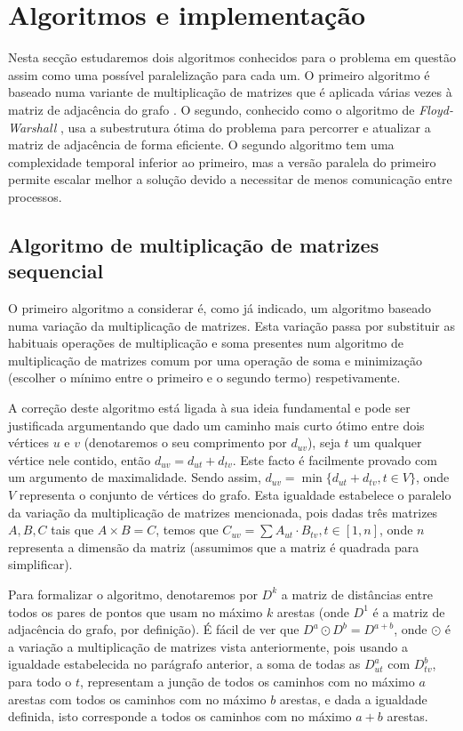\documentclass[10pt,a4paper,oneside]{article}
\begin{document}
\section{Algoritmos e implementação}
\label{sec:ai}
Nesta secção estudaremos dois algoritmos conhecidos para o problema em
questão assim como uma possível paralelização para cada um. O primeiro
algoritmo é baseado numa variante de multiplicação de matrizes que é
aplicada várias vezes à matriz de adjacência do grafo
\cite{shimbel1953structural}. O segundo, conhecido como o algoritmo de
\textit{Floyd-Warshall} \cite{floyd1962algorithm}, usa a subestrutura
ótima do problema para percorrer e atualizar a matriz de adjacência de
forma eficiente. O segundo algoritmo tem uma complexidade temporal
inferior ao primeiro, mas a versão paralela do primeiro permite
escalar melhor a solução devido a necessitar de menos comunicação
entre processos.

\subsection{Algoritmo de multiplicação de matrizes sequencial}
O primeiro algoritmo a considerar é, como já indicado, um algoritmo
baseado numa variação da multiplicação de matrizes. Esta variação
passa por substituir as habituais operações de multiplicação e soma
presentes num algoritmo de multiplicação de matrizes comum por uma
operação de soma e minimização (escolher o mínimo entre o primeiro e o
segundo termo) respetivamente.

A correção deste algoritmo está ligada à sua ideia fundamental e pode
ser justificada argumentando que dado um caminho mais curto ótimo
entre dois vértices $u$ e $v$ (denotaremos o seu comprimento por
$d_{uv}$), seja $t$ um qualquer vértice nele contido, então $d_{uv} =
d_{ut} + d_{tv}$. Este facto é facilmente provado com um argumento de
maximalidade. Sendo assim, $d_{uv} = \min{\{d_{ut} + d_{tv}, t \in
  V\}}$, onde $V$ representa o conjunto de vértices do grafo. Esta
igualdade estabelece o paralelo da variação da multiplicação de
matrizes mencionada, pois dadas três matrizes $A, B, C$ tais que $A
\times B = C$, temos que $C_{uv} = \sum{A_{ut} \cdot B_{tv}}, t \in
       [1, n]$, onde $n$ representa a dimensão da matriz (assumimos
       que a matriz é quadrada para simplificar).

Para formalizar o algoritmo, denotaremos por $D^k$ a matriz de
distâncias entre todos os pares de pontos que usam no máximo $k$
arestas (onde $D^1$ é a matriz de adjacência do grafo, por
definição). É fácil de ver que $D^a \odot D^b = D^{a + b}$, onde
$\odot$ é a variação a multiplicação de matrizes vista anteriormente,
pois usando a igualdade estabelecida no parágrafo anterior, a soma de
todas as $D^a_{ut}$ com $D^b_{tv}$, para todo o $t$, representam a
junção de todos os caminhos com no máximo $a$ arestas com todos os
caminhos com no máximo $b$ arestas, e dada a igualdade definida, isto
corresponde a todos os caminhos com no máximo $a+b$ arestas.
\end{document}
